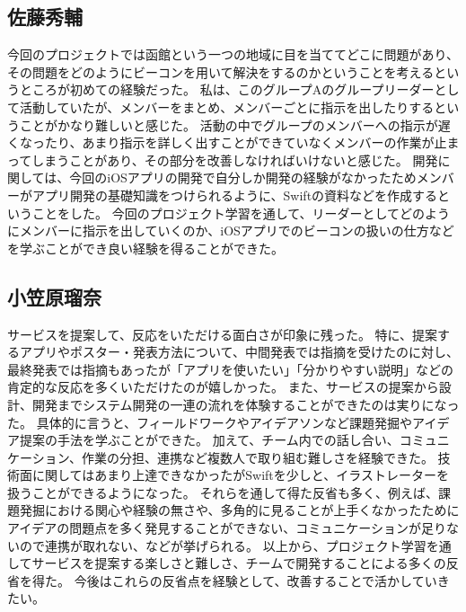 \documentclass[openany,11pt,papersize]{jsbook}
\begin{document}
\subsection{佐藤秀輔}
今回のプロジェクトでは函館という一つの地域に目を当ててどこに問題があり、その問題をどのようにビーコンを用いて解決をするのかということを考えるというところが初めての経験だった。
私は、このグループAのグループリーダーとして活動していたが、メンバーをまとめ、メンバーごとに指示を出したりするということがかなり難しいと感じた。
活動の中でグループのメンバーへの指示が遅くなったり、あまり指示を詳しく出すことができていなくメンバーの作業が止まってしまうことがあり、その部分を改善しなければいけないと感じた。
開発に関しては、今回のiOSアプリの開発で自分しか開発の経験がなかったためメンバーがアプリ開発の基礎知識をつけられるように、Swiftの資料などを作成するということをした。
今回のプロジェクト学習を通して、リーダーとしてどのようにメンバーに指示を出していくのか、iOSアプリでのビーコンの扱いの仕方などを学ぶことができ良い経験を得ることができた。


\subsection{小笠原瑠奈}
サービスを提案して、反応をいただける面白さが印象に残った。
特に、提案するアプリやポスター・発表方法について、中間発表では指摘を受けたのに対し、最終発表では指摘もあったが「アプリを使いたい」「分かりやすい説明」などの肯定的な反応を多くいただけたのが嬉しかった。
また、サービスの提案から設計、開発までシステム開発の一連の流れを体験することができたのは実りになった。
具体的に言うと、フィールドワークやアイデアソンなど課題発掘やアイデア提案の手法を学ぶことができた。
加えて、チーム内での話し合い、コミュニケーション、作業の分担、連携など複数人で取り組む難しさを経験できた。
技術面に関してはあまり上達できなかったがSwiftを少しと、イラストレーターを扱うことができるようになった。
それらを通して得た反省も多く、例えば、課題発掘における関心や経験の無さや、多角的に見ることが上手くなかったためにアイデアの問題点を多く発見することができない、コミュニケーションが足りないので連携が取れない、などが挙げられる。
以上から、プロジェクト学習を通してサービスを提案する楽しさと難しさ、チームで開発することによる多くの反省を得た。
今後はこれらの反省点を経験として、改善することで活かしていきたい。

\end{document}

